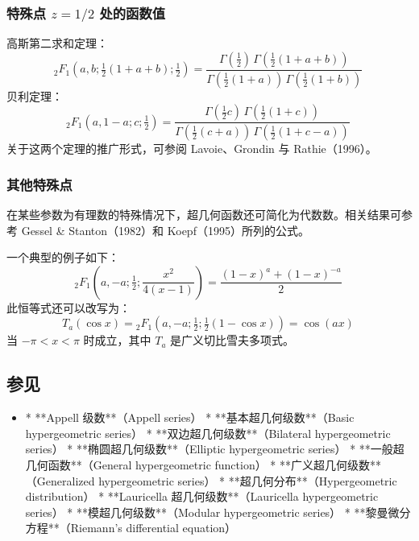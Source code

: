 \subsubsection{特殊点 $z = 1/2$ 处的函数值}
高斯第二求和定理：
$$
{}_2F_1\left(a, b; \tfrac{1}{2}(1 + a + b); \tfrac{1}{2} \right)
=
\frac{
\Gamma\left(\tfrac{1}{2}\right)\, \Gamma\left(\tfrac{1}{2}(1 + a + b)\right)
}{
\Gamma\left(\tfrac{1}{2}(1 + a)\right)\, \Gamma\left(\tfrac{1}{2}(1 + b)\right)}~
$$
贝利定理：
$$
{}_2F_1\left(a, 1 - a; c; \tfrac{1}{2} \right)
=
\frac{
\Gamma\left(\tfrac{1}{2}c\right)\, \Gamma\left(\tfrac{1}{2}(1 + c)\right)
}{
\Gamma\left(\tfrac{1}{2}(c + a)\right)\, \Gamma\left(\tfrac{1}{2}(1 + c - a)\right)}~
$$
关于这两个定理的推广形式，可参阅 Lavoie、Grondin 与 Rathie（1996）。
\subsubsection{其他特殊点}
在某些参数为有理数的特殊情况下，超几何函数还可简化为代数数。相关结果可参考 Gessel & Stanton（1982）和 Koepf（1995）所列的公式。

一个典型的例子如下：
$$
{}_2F_1\left(a, -a; \tfrac{1}{2}; \frac{x^2}{4(x - 1)}\right)
=
\frac{(1 - x)^a + (1 - x)^{-a}}{2}~
$$
此恒等式还可以改写为：
$$
T_a(\cos x)
=
{}_2F_1\left(a, -a; \tfrac{1}{2}; \tfrac{1}{2}(1 - \cos x)\right)
=
\cos(ax)~
$$
当 $-\pi < x < \pi$ 时成立，其中 $T_a$ 是广义切比雪夫多项式。

\subsection{参见}

\begin{itemize}
\item * **Appell 级数**（Appell series）
* **基本超几何级数**（Basic hypergeometric series）
* **双边超几何级数**（Bilateral hypergeometric series）
* **椭圆超几何级数**（Elliptic hypergeometric series）
* **一般超几何函数**（General hypergeometric function）
* **广义超几何级数**（Generalized hypergeometric series）
* **超几何分布**（Hypergeometric distribution）
* **Lauricella 超几何级数**（Lauricella hypergeometric series）
* **模超几何级数**（Modular hypergeometric series）
* **黎曼微分方程**（Riemann's differential equation）

\end{itemize}